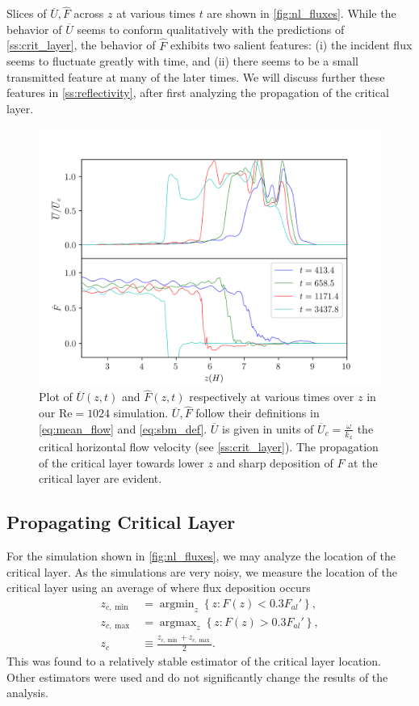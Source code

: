 \documentclass[
        fleqn,
        usenatbib,
    ]{mnras}
\newcommand*{\z}[1]{\left\{#1\right\}}
\DeclareMathOperator*{\argmin}{argmin}
\DeclareMathOperator*{\argmax}{argmax}
\begin{document}
Slices of
$\overline{U}, \hat{F}$ across $z$ at various times $t$ are shown in
\autoref{fig:nl_fluxes}. While the behavior of $\overline{U}$ seems to conform
qualitatively with the predictions of \autoref{ss:crit_layer}, the behavior of
$\hat{F}$ exhibits two salient features: (i) the incident flux seems to
fluctuate greatly with time, and (ii) there seems to be a small transmitted
feature at many of the later times. We will discuss further these features in
\autoref{ss:reflectivity}, after first analyzing the propagation of the critical
layer.
\begin{figure}
    \centering
    \includegraphics[width=\columnwidth]{plots/nl_fluxes.png}
    \caption{Plot of $\overline{U}(z, t)$ and $\hat{F}(z, t)$ respectively at
    various times over $z$ in our $\mathrm{Re} = 1024$ simulation.
    $\overline{U}, \hat{F}$ follow their definitions in \autoref{eq:mean_flow}
    and \autoref{eq:sbm_def}. $\overline{U}$ is given in units of
    $\overline{U}_c = \frac{\omega}{k_{x}}$ the critical horizontal flow
    velocity (see \autoref{ss:crit_layer}). The propagation of the critical
    layer towards lower $z$ and sharp deposition of $F$ at the critical layer
    are evident.}\label{fig:nl_fluxes}
\end{figure}

\subsection{Propagating Critical Layer}

For the simulation shown in \autoref{fig:nl_fluxes}, we may analyze the location
of the critical layer. As the simulations are very noisy, we measure the location
of the critical layer using an average of where flux deposition occurs
\begin{align}
    z_{c, \min} &= \argmin_z \z{z: F(z) < 0.3F_{al}'},\nonumber\\
    z_{c, \max} &= \argmax_z \z{z: F(z) > 0.3F_{al}'},\nonumber\\
    z_c &\equiv \frac{z_{c, \min} + z_{c, \max}}{2}.\label{eq:zc_def}
\end{align}
This was found to a relatively stable estimator of the critical layer location.
Other estimators were used and do not significantly change the results of the
analysis.
\end{document}
